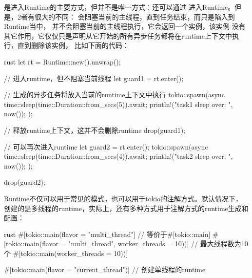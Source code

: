 是进入Runtime的主要方式，但并不是唯一方式：还可以通过
进入Runtime。但是，2者有很大的不同：
会阻塞当前的主线程，直到任务结束，而只是陷入到Runtime当中，
并不会阻塞当前的主线程执行，它会返回一个实例，该实例
没有其它作用，它仅仅只是声明从它开始的所有异步任务都将在runtime上下文中执行，直到删除该实例，
比如下面的代码：
\begin{code-block}{rust}
let rt = Runtime::new().unwrap();

// 进入runtime，但不阻塞当前线程
let guard1 = rt.enter();

// 生成的异步任务将放入当前的runtime上下文中执行
tokio::spawn(async {
  time::sleep(time::Duration::from_secs(5)).await;
  println!("task1 sleep over: {}", now());
});

// 释放runtime上下文，这并不会删除runtime
drop(guard1);

// 可以再次进入runtime
let guard2 = rt.enter();
tokio::spawn(async {
  time::sleep(time::Duration::from_secs(4)).await;
  println!("task2 sleep over: {}", now());
});

drop(guard2);
\end{code-block}

Runtime不仅可以用于常见的模式，也可以用于tokio的注解方式。默认情况下，
创建的是多线程的runtime，实际上，还有多种方式用于注解方式的runtime生成和配置：
\begin{code-block}{rust}
#[tokio::main(flavor = "multi_thread"] // 等价于#[tokio::main]
#[tokio::main(flavor = "multi_thread", worker_threads = 10))] // 最大线程数为10个
#[tokio::main(worker_threads = 10))]

#[tokio::main(flavor = "current_thread")] // 创建单线程的runtime
\end{code-block}

